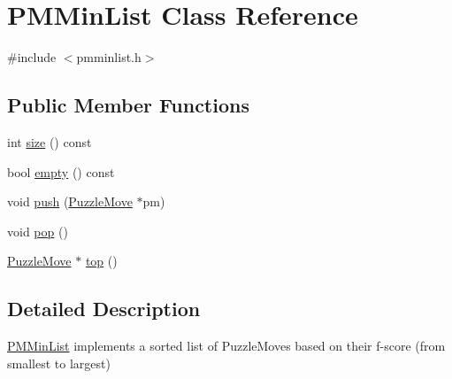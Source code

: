 \hypertarget{classPMMinList}{\section{\-P\-M\-Min\-List \-Class \-Reference}
\label{classPMMinList}
}


{\ttfamily \#include $<$pmminlist.\-h$>$}

\subsection*{\-Public \-Member \-Functions}
\begin{DoxyCompactItemize}
\item 
int \hyperlink{classPMMinList_a692220d438ffab3cf6729de3dc38c1fb}{size} () const 
\item 
bool \hyperlink{classPMMinList_a1c148a978af1a6ea964ee7141a80855e}{empty} () const 
\item 
void \hyperlink{classPMMinList_aafa81672d5dd017bf5e6f76b65022d21}{push} (\hyperlink{classPuzzleMove}{\-Puzzle\-Move} $\ast$pm)
\item 
void \hyperlink{classPMMinList_a77fa8f64f75cc6c1469688928d372089}{pop} ()
\item 
\hyperlink{classPuzzleMove}{\-Puzzle\-Move} $\ast$ \hyperlink{classPMMinList_a6a04fe787c09097ecd3a76428a3524ba}{top} ()
\end{DoxyCompactItemize}


\subsection{\-Detailed \-Description}
\hyperlink{classPMMinList}{\-P\-M\-Min\-List} implements a sorted list of \-Puzzle\-Moves based on their f-\/score (from smallest to largest) 

